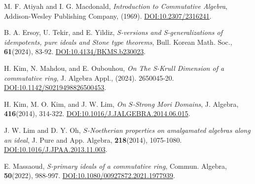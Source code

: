 \documentclass[11pt]{article}
\begin{document}
\begin{thebibliography}{999}
		M. F. Atiyah and I. G. Macdonald, \textit{Introduction to Commutative Algebra}, Addison-Wesley Publishing Company, (1969). \href{https://www.jstor.org/stable/2316241?origin=crossref&seq=1}{DOI:10.2307/2316241}.
		
		
		
		B. A. Ersoy, U. Tekir, and E. Yildiz, \textit{S-versions and S-generalizations of idempotents, pure ideals and Stone type theorems}, Bull. Korean Math. Soc., \textbf{61}(2024), 83-92. \href{ https://doi.org/10.4134/BKMS.b230023}{DOI:10.4134/BKMS.b230023}.
		
		H. Kim, N. Mahdou, and E. Oubouhou, \textit{On The S-Krull Dimension of a commutative ring}, J. Algebra Appl., (2024).  2650045-20. \href{https://doi.org/10.1142/S0219498826500453}{DOI:10.1142/S0219498826500453}.
		
		H. Kim, M. O. Kim, and J. W. Lim, \textit{On $S$-Strong Mori Domains}, J. Algebra, \textbf{416}(2014), 314-322. \href{https://www.sciencedirect.com/science/article/pii/S0021869314003470?via%3Dihub}{DOI:10.1016/J.JALGEBRA.2014.06.015}.
		
        
		J. W. Lim and D. Y. Oh,  \textit{$S$-Noetherian properties on amalgamated algebras along an ideal}, J. Pure and App. Algebra, \textbf{218}(2014), 1075-1080. \href{https://www.sciencedirect.com/science/article/abs/pii/S0022404913002077?via%3Dihub}{DOI:10.1016/J.JPAA.2013.11.003}.
		
		
		
		
		
        
        E. Massaoud, \textit{S-primary ideals of a commutative ring}, Commun. Algebra, \textbf{50}(2022), 988-997. \href{https://www.tandfonline.com/doi/full/10.1080/00927872.2021.1977939}{DOI:10.1080/00927872.2021.1977939}.
        

\end{thebibliography}
\end{document}
